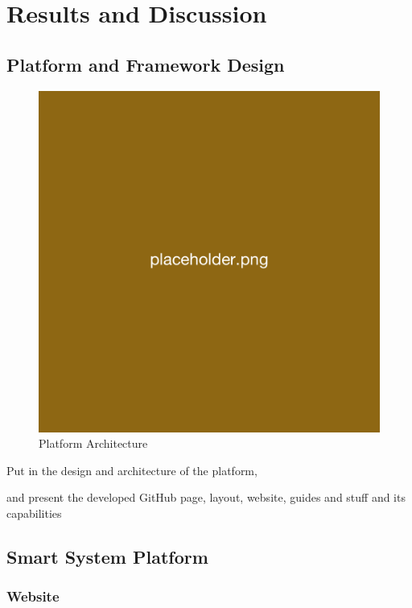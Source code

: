 \cleardoublepage%
\chapter{\label{chap:res}Results and Discussion}%


\section{\label{sec:res_design}Platform and Framework Design} %

\begin{figure}[H]
    \centering
    \includegraphics[width=0.5\linewidth]{overleaf/images/placeholder.png}
    \vspace{\ftspace}
    \caption{Platform Architecture}
    \label{fig:ssp_architecture}
\end{figure}

Put in the design and architecture of the platform,


and present the developed GitHub page, layout, website, guides and stuff and its capabilities

\section{\label{sec:res_capabilities}Smart System Platform} %

\subsection{\label{sec:res_website}Website}

